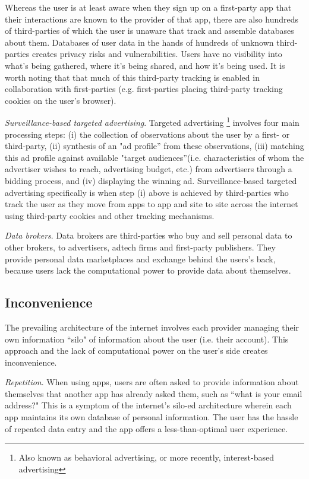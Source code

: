 \documentclass[11pt, oneside]{article}   	%
\begin{document}
Whereas the user is at least aware when they sign up on a first-party app that their interactions are known to the provider of that app, there are also hundreds of third-parties of which the user is unaware that track and assemble databases about them. Databases of user data in the hands of hundreds of unknown third-parties creates privacy risks and vulnerabilities. Users have no visibility into what's being gathered, where it's being shared, and how it's being used. It is worth noting that that much of this third-party tracking is enabled in collaboration with first-parties (e.g. first-parties placing third-party tracking cookies on the user's browser).

\emph{Surveillance-based targeted advertising}. Targeted advertising \footnote{Also known as behavioral advertising, or more recently, interest-based advertising} involves four main processing steps: (i) the collection of observations about the user by a first- or third-party, (ii) synthesis of an "ad profile” from these observations, (iii) matching this ad profile against available "target audiences”(i.e. characteristics of whom the advertiser wishes to reach, advertising budget, etc.) from advertisers through a bidding process, and (iv) displaying the winning ad. Surveillance-based targeted advertising specifically is when step (i) above is achieved by third-parties who track the user as they move from apps to app and site to site across the internet using third-party cookies and other tracking mechanisms. 

\emph{Data brokers}. Data brokers are third-parties who buy and sell personal data to other brokers, to advertisers, adtech firms and first-party publishers. They provide  personal data marketplaces and exchange behind the users's back, because users lack the computational power to provide data about themselves.


\subsection{Inconvenience}
The prevailing architecture of the internet involves each provider managing their own  information ``silo" of information about the user (i.e. their account). This approach and the lack of computational power on the user's side creates inconvenience.

\emph{Repetition}. When using apps, users are often asked to provide information about themselves that another app has already asked them, such as ``what is your email address?" This is a symptom of the internet's silo-ed architecture wherein each app maintains its own database of personal information. The user has the hassle of repeated data entry and the app offers a less-than-optimal user experience.
\end{document}
